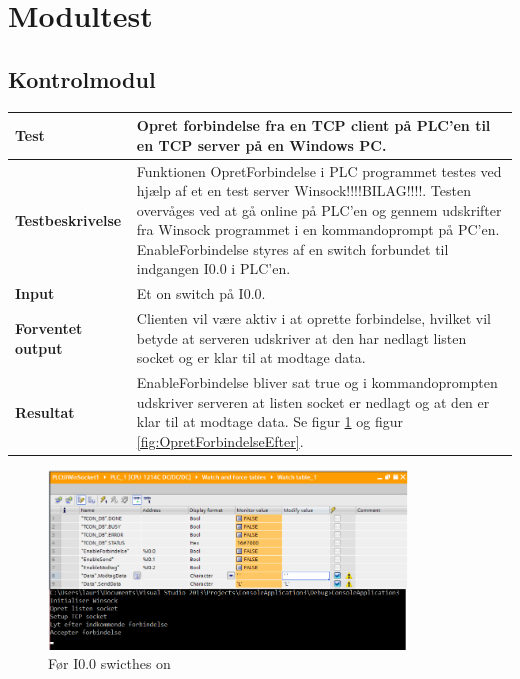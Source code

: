 
\section{Modultest}

\subsection{Kontrolmodul}

\begin{center}
	\begin{tabular}{ | m{} | m{}|} 
		\hline
		\textbf{Test}					&Opret forbindelse fra en TCP client på PLC'en til en TCP server på en Windows PC. \\ \hline
		\textbf{Testbeskrivelse}		&Funktionen OpretForbindelse i PLC programmet testes ved hjælp af et en test server Winsock!!!!BILAG!!!!. Testen overvåges ved at gå online på PLC'en og gennem udskrifter fra Winsock programmet i en kommandoprompt på PC'en. EnableForbindelse styres af en switch forbundet til indgangen I0.0 i PLC'en.\\ \hline
		\textbf{Input}					& Et on switch på I0.0.\\ \hline
		\textbf{Forventet output}		&Clienten vil være aktiv i at oprette forbindelse, hvilket vil betyde at serveren udskriver at den har nedlagt listen socket og er klar til at modtage data.\\ \hline
		\textbf{Resultat}				&EnableForbindelse bliver sat true og i kommandoprompten udskriver serveren at listen socket er nedlagt og at den er klar til at modtage data. Se figur \ref{fig:OpretForbindelseFoer} og figur \ref{fig:OpretForbindelseEfter}.   \\ \hline
	\end{tabular}
\end{center}

\begin{figure}[H] %
	\centering
	\includegraphics[width=0.85\textwidth]{Test/ModultestStyringsenhed/OpretForbindelseFoer}
	\caption{Før I0.0 swicthes on}
	\label{fig:OpretForbindelseFoer}
\end{figure}

